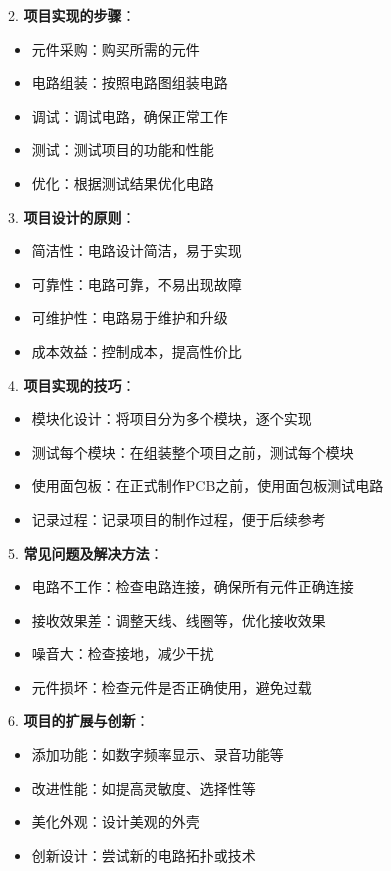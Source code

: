 \documentclass[12pt,UTF8]{ctexbook}
\begin{document}
2. \textbf{项目实现的步骤}：
   \begin{itemize}[leftmargin=3.5em]
   \item 元件采购：购买所需的元件
   \item 电路组装：按照电路图组装电路
   \item 调试：调试电路，确保正常工作
   \item 测试：测试项目的功能和性能
   \item 优化：根据测试结果优化电路
   \end{itemize}

3. \textbf{项目设计的原则}：
   \begin{itemize}[leftmargin=3.5em]
   \item 简洁性：电路设计简洁，易于实现
   \item 可靠性：电路可靠，不易出现故障
   \item 可维护性：电路易于维护和升级
   \item 成本效益：控制成本，提高性价比
   \end{itemize}

4. \textbf{项目实现的技巧}：
   \begin{itemize}[leftmargin=3.5em]
   \item 模块化设计：将项目分为多个模块，逐个实现
   \item 测试每个模块：在组装整个项目之前，测试每个模块
   \item 使用面包板：在正式制作PCB之前，使用面包板测试电路
   \item 记录过程：记录项目的制作过程，便于后续参考
   \end{itemize}

5. \textbf{常见问题及解决方法}：
   \begin{itemize}[leftmargin=3.5em]
   \item 电路不工作：检查电路连接，确保所有元件正确连接
   \item 接收效果差：调整天线、线圈等，优化接收效果
   \item 噪音大：检查接地，减少干扰
   \item 元件损坏：检查元件是否正确使用，避免过载
   \end{itemize}

6. \textbf{项目的扩展与创新}：
   \begin{itemize}[leftmargin=3.5em]
   \item 添加功能：如数字频率显示、录音功能等
   \item 改进性能：如提高灵敏度、选择性等
   \item 美化外观：设计美观的外壳
   \item 创新设计：尝试新的电路拓扑或技术
   \end{itemize}
\end{document}
